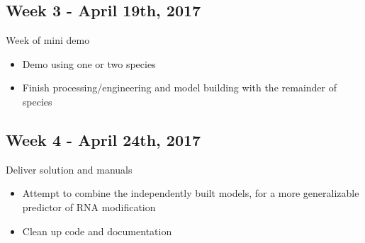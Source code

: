 \documentclass[paper=a4, fontsize=11pt]{scrartcl}
\numberwithin{equation}{section}    %
\numberwithin{figure}{section}      %
\numberwithin{table}{section}       %
\numberwithin{equation}{section}    %
\numberwithin{figure}{section}      %
\numberwithin{table}{section}       %
\begin{document}
\subsection{Week 3 - April 19th, 2017}
Week of mini demo
\begin{itemize}
	\item Demo using one or two species 
	\item Finish processing/engineering and model building with the remainder of species
\end{itemize}


\subsection{Week 4 - April 24th, 2017}
Deliver solution and manuals
\begin{itemize}
	\item Attempt to combine the independently built models, for a more generalizable predictor of RNA modification
	\item Clean up code and documentation
\end{itemize}

\begin{thebibliography}{1}


\end{thebibliography}
\end{document}
